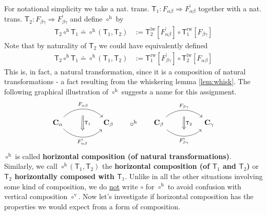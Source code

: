 For notational simplicity we take a nat. trans. $\mathsf{T}_{1} \colon F_{\alpha\beta} \Rightarrow F_{\alpha\beta}^{\backprime}$ together with a nat. trans. $\mathsf{T}_{2} \colon F_{\beta\gamma} \Rightarrow F_{\beta\gamma}^{\backprime}$ and define $\circ^{\textrm{h}}$ by
\begin{align*}
  \mathsf{T}_{2} \circ^{\textrm{h}} \mathsf{T}_{1}
  \doteq
  \circ^{\textrm{h}}(\mathsf{T}_{1},\mathsf{T}_{2})
  &:=
  \mathsf{T}_{2}^{\mathrm{lw}}
  [F_{\alpha\beta}^{\backprime}]
  \circ
  \mathsf{T}_{1}^{\mathrm{rw}}
  [F_{\beta\gamma}]
\end{align*}
Note that by naturality of $\mathsf{T}_{2}$ we could have equivalently defined
\begin{align*}
  \mathsf{T}_{2} \circ^{\textrm{h}} \mathsf{T}_{1}
  \doteq
  \circ^{\textrm{h}}(\mathsf{T}_{1},\mathsf{T}_{2})
  &:=
  \mathsf{T}_{1}^{\mathrm{rw}}
  [F_{\beta\gamma}^{\backprime}]
  \circ
  \mathsf{T}_{2}^{\mathrm{lw}}
  [F_{\alpha\beta}]
\end{align*}
This is, in fact, a natural transformation, since it is a composition of natural transformations - a fact resulting from the whiskering lemma \ref{lem:whisk}.
The following graphical illustration of $\circ^{\textrm{h}}$ suggests a name for this assignment.
\[
\begin{tikzcd}[sep=huge]
  \mathbf{C}_{\alpha}
  \arrow[bend left=45]{r}[name=fab]{F_{\alpha\beta}}
  \arrow[bend right=45,swap]{r}[name=fab*]{F_{\alpha\beta}^{\backprime}}
  &
  \mathbf{C}_{\beta}
  \arrow[phantom]{r}{\circ^{\textrm{h}}}
  &
  \mathbf{C}_{\beta}
  \arrow[bend left=40]{r}[name=fbc]{F_{\beta\gamma}}
  \arrow[bend right=40,swap]{r}[name=fbc*]{F_{\beta\gamma}^{\backprime}}
  &
  \mathbf{C}_{\gamma}
  \arrow[from=fab,to=fab*,shorten <= 9pt,shorten >= 9pt,Rightarrow]{d}{\mathsf{T}_{1}}
  \arrow[from=fbc,to=fbc*,shorten <= 9pt,shorten >= 9pt,Rightarrow]{d}{\mathsf{T}_{2}}
\end{tikzcd}
\]
$\circ^{\textrm{h}}$ is called \textbf{horizontal composition (of natural transformations)}.
Similarly, we call $\circ^{\textrm{h}}(\mathsf{T}_{1},\mathsf{T}_{2})$ the \textbf{horizontal composition (of $\mathsf{T}_{1}$ and $\mathsf{T}_{2}$)} or \textbf{$\mathsf{T}_{2}$ horizontally composed with $\mathsf{T}_{1}$}.
Unlike in all the other situations involving some kind of composition, we do \underline{not} write $\circ$ for $\circ^{\textrm{h}}$ to avoid confusion with vertical composition $\circ^{\textrm{v}}$.
Now let's investigate if horizontal composition has the properties we would expect from a form of composition.
